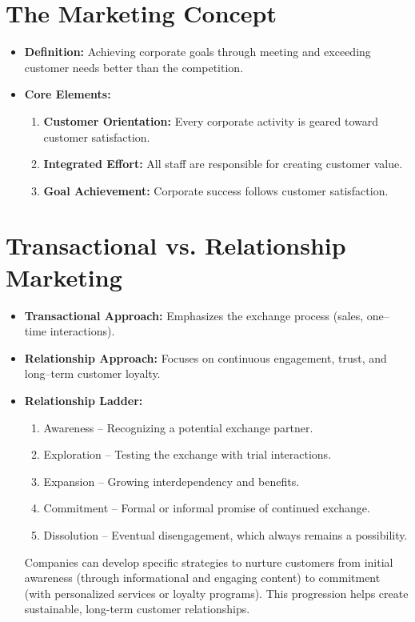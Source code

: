 \documentclass[12pt,a4paper]{report}
\begin{document}
\section{The Marketing Concept}
\begin{itemize}
    \item \textbf{Definition:} Achieving corporate goals through meeting and exceeding customer needs better than the competition.
    \item \textbf{Core Elements:}
    \begin{enumerate}[label=\alph*.]
        \item \textbf{Customer Orientation:} Every corporate activity is geared toward customer satisfaction.
        \item \textbf{Integrated Effort:} All staff are responsible for creating customer value.
        \item \textbf{Goal Achievement:} Corporate success follows customer satisfaction.
    \end{enumerate}
\end{itemize}

\section{Transactional vs. Relationship Marketing}
\begin{itemize}
    \item \textbf{Transactional Approach:} Emphasizes the exchange process (sales, one--time interactions).
    \item \textbf{Relationship Approach:} Focuses on continuous engagement, trust, and long--term customer loyalty.
    \item \textbf{Relationship Ladder:} 
    \begin{enumerate}[label=\arabic*.]
        \item Awareness -- Recognizing a potential exchange partner.
        \item Exploration -- Testing the exchange with trial interactions.
        \item Expansion -- Growing interdependency and benefits.
        \item Commitment -- Formal or informal promise of continued exchange.
        \item Dissolution -- Eventual disengagement, which always remains a possibility.
    \end{enumerate}
    Companies can develop specific strategies to nurture customers from initial awareness (through informational and engaging content) to commitment (with personalized services or loyalty programs). This progression helps create sustainable, long-term customer relationships.
\end{itemize}
\end{document}
